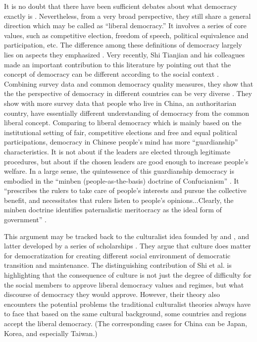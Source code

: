 \documentclass[abstracton,UTF8]{ctexart}
\begin{document}
It is no doubt that there have been sufficient debates about what democracy exactly is \citep[see, for example, ][]{Sen1999,Dahl1989,Schumpeter1947,Pateman1970,Karl1991a,Munck2014,Przeworski2000}. Nevertheless, from a very broad perspective, they still share a general direction which may be called as ``liberal democracy.'' It involves a series of core values, such as competitive election, freedom of speech, political equivalence and participation, etc. The difference among these definitions of democracy largely lies on aspects they emphasized \citep{Lu2014a}. Very recently, Shi Tianjian and his colleagues made an important contribution to this literature by pointing out that the concept of democracy can be different according to the social context \citep{Lu2014a,Shi2014}. Combining survey data and common democracy quality measures, they show that the the perspective of democracy in different countries can be very diverse \citep[Table 1]{Lu2014a}. They show with more survey data that people who live in China, an authoritarian country, have essentially different understanding of democracy from the common liberal concept. Comparing to liberal democracy which is mainly based on the institutional setting of fair, competitive elections and free and equal political participations, democracy in Chinese people's mind has more ``guardianship'' characteristics. It is not about if the leaders are elected through legitimate procedures, but about if the chosen leaders are good enough to increase people's welfare. In a large sense, the quintessence of this guardianship democracy is embodied in the ``minben (people-as-the-basis) doctrine of Confucianism'' \citep[198]{Shi2014}. It ``prescribes the rulers to take care of people’s interests and pursue the collective benefit, and necessitates that rulers listen to people's opinions...Clearly, the minben doctrine identifies paternalistic meritocracy as the ideal form of government'' \citep[7]{Lu2014a}.

This argument may be tracked back to the culturalist idea founded by \citet{Weber1958} and \citet{Almond1989}, and latter developed by a series of scholarships \citep[see, for example, ][]{1984,Putnam1994,PYE2006,Pye1992,Inglehart2005,Fuchs2007}. They argue that culture does matter for democratization for creating different social environment of democratic transition and maintenance. The distinguishing contribution of Shi et al. is highlighting that the consequence of culture is not just the degree of difficulty for the social members to approve liberal democracy values and regimes, but what discourse of democracy they would approve. However, their theory also encounters the potential problems the traditional culturalist theories always have to face that based on the same cultural background, some countries and regions accept the liberal democracy. (The corresponding cases for China can be Japan, Korea, and especially Taiwan.)
\end{document}
